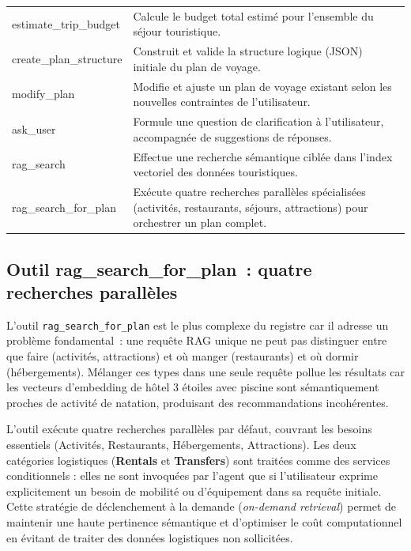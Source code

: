 \begin{table}[H]
\begin{tabular}{p{4.5cm} p{10.5cm}}
        estimate\_trip\_budget & Calcule le budget total estimé pour l'ensemble du séjour touristique. \\[2pt]
        create\_plan\_structure & Construit et valide la structure logique (JSON) initiale du plan de voyage. \\[2pt]
        modify\_plan & Modifie et ajuste un plan de voyage existant selon les nouvelles contraintes de l'utilisateur. \\[2pt]
        ask\_user & Formule une question de clarification à l'utilisateur, accompagnée de suggestions de réponses. \\[2pt]
        rag\_search & Effectue une recherche sémantique ciblée dans l'index vectoriel des données touristiques. \\[2pt]
        rag\_search\_for\_plan & Exécute quatre recherches parallèles spécialisées (activités, restaurants, séjours, attractions) pour orchestrer un plan complet. \\
        \bottomrule
    \end{tabular}
\end{table}


\subsection{Outil rag\_search\_for\_plan~: quatre recherches parallèles}

L'outil \texttt{rag\_search\_for\_plan} est le plus complexe du registre car il adresse un
problème fondamental~: une requête RAG unique ne peut pas distinguer entre \og{}que faire\fg{}
(activités, attractions) et \og{}où manger\fg{} (restaurants) et \og{}où dormir\fg{}
(hébergements). Mélanger ces types dans une seule requête pollue les résultats car les vecteurs
d'embedding de \og{}hôtel 3 étoiles avec piscine\fg{} sont sémantiquement proches de
\og{}activité de natation\fg{}, produisant des recommandations incohérentes.

L'outil exécute quatre recherches parallèles par défaut, couvrant les besoins essentiels 
(Activités, Restaurants, Hébergements, Attractions). Les deux catégories logistiques 
(\textbf{Rentals} et \textbf{Transfers}) sont traitées comme des services conditionnels : 
elles ne sont invoquées par l'agent que si l'utilisateur exprime explicitement un besoin 
de mobilité ou d'équipement dans sa requête initiale. Cette stratégie de déclenchement à la 
demande (\textit{on-demand retrieval}) permet de maintenir une haute pertinence sémantique et 
d'optimiser le coût computationnel en évitant de traiter des données logistiques non sollicitées.

